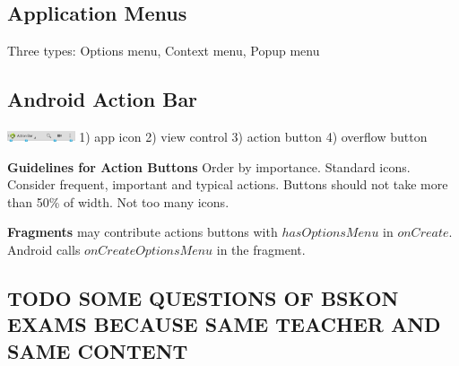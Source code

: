 \subsection{Application Menus}
Three types: Options menu, Context menu, Popup menu

\subsection{Android Action Bar}
\includegraphics[width=0.15\textwidth]{android/actionbar.png}
1) app icon
2) view control
3) action button
4) overflow button

\textbf{Guidelines for Action Buttons}
Order by importance. Standard icons. Consider frequent, important and typical
actions. Buttons should not take more than 50\% of width. Not too many icons.

\textbf{Fragments} may contribute actions buttons with $hasOptionsMenu$ in
$onCreate$. Android calls $onCreateOptionsMenu$ in the fragment.

\newpage
\subsection{TODO SOME QUESTIONS OF BSKON EXAMS BECAUSE SAME TEACHER AND SAME CONTENT}

